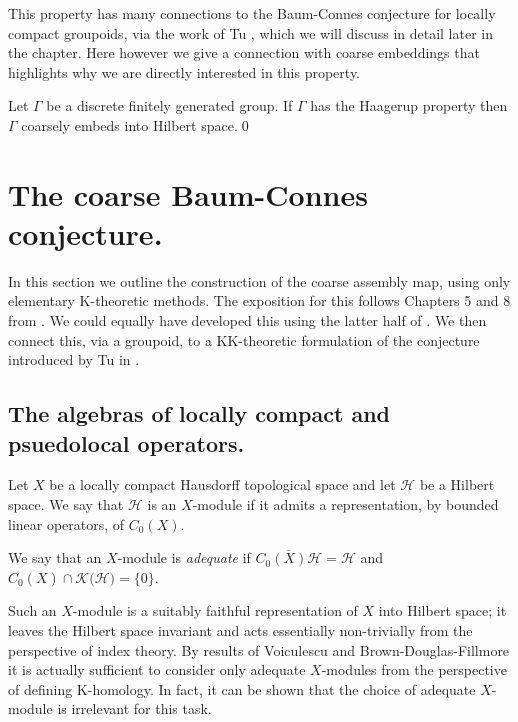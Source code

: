 This property has many connections to the Baum-Connes conjecture for locally compact groupoids, via the work of Tu \cite{MR1703305,MR1798599,cbcag2}, which we will discuss in detail later in the chapter. Here however we give a connection with coarse embeddings that highlights why we are directly interested in this property.

\begin{proposition}
Let $\Gamma$ be a discrete finitely generated group. If $\Gamma$ has the Haagerup property then $\Gamma$ coarsely embeds into Hilbert space.\qed
\end{proposition}

\section{The coarse Baum-Connes conjecture.}

In this section we outline the construction of the coarse assembly map, using only elementary K-theoretic methods. The exposition for this follows Chapters 5 and 8 from \cite{MR1399087}. We could equally have developed this using the latter half of \cite{MR1817560,MR1388312}. We then connect this, via a groupoid, to a KK-theoretic formulation of the conjecture introduced by Tu in \cite{MR1703305,MR1798599}.

\subsection{The algebras of locally compact and psuedolocal operators.}
Let $X$ be a locally compact Hausdorff topological space and let $\mathcal{H}$ be a Hilbert space. We say that $\mathcal{H}$ is an $X$-module if it admits a representation, by bounded linear operators, of $C_{0}(X)$. 

\begin{definition}
We say that an $X$-module is \textit{adequate} if $\overline{C_{0}(X)\mathcal{H}}=\mathcal{H}$ and $C_{0}(X)\cap \mathcal{K(\mathcal{H}})= \lbrace 0 \rbrace$.
\end{definition}

\begin{remark}
Such an $X$-module is a suitably faithful representation of $X$ into Hilbert space; it leaves the Hilbert space invariant and acts essentially non-trivially from the perspective of index theory. By results of Voiculescu \cite{MR0415338} and Brown-Douglas-Fillmore \cite{MR0458196} it is actually sufficient to consider only adequate $X$-modules from the perspective of defining K-homology. In fact, it can be shown that the choice of adequate $X$-module is irrelevant for this task.
\end{remark}

